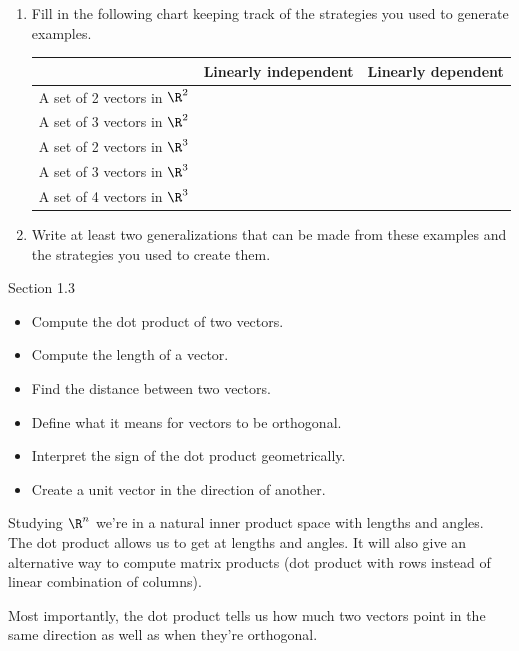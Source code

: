 \documentclass{problemset}
\begin{document}
\begin{enumerate}
	\item Fill in the following chart keeping track of the strategies you used to generate
examples.

\vspace{2mm}

\begin{center}
\begin{tabular}{|c|c|c|}
	\hline
	&Linearly independent & Linearly dependent \\
	\hline
	A set of 2 vectors in $\R^2$ &&\\
	\hline
	A set of 3 vectors in $\R^2$ &&\\
	\hline
	A set of 2 vectors in $\R^3$ &&\\
	\hline
	A set of 3 vectors in $\R^3$ &&\\
	\hline
	A set of 4 vectors in $\R^3$ &&\\
	\hline
\end{tabular}
\end{center}
	
		\item Write at least two generalizations that can
			be made from these examples and the strategies you
			used to create them.

\end{enumerate}


\newpage
\pagestyle{siefken}


\begin{lesson}
	\newpage

	Section 1.3

	\begin{itemize}
		\item Compute the dot product of two vectors.
		\item Compute the length of a vector.
		\item Find the distance between two vectors.
		\item Define what it means for vectors to be orthogonal.
		\item Interpret the sign of the dot product geometrically.
		\item Create a unit vector in the direction of another.
	\end{itemize}

	Studying $\R^n$ we're in a natural inner product space with lengths and
	angles. The dot product allows us to get at lengths and angles. It will
	also give an alternative way to compute matrix products (dot product with rows
	instead of linear combination of columns). 

	Most importantly, the dot product tells us how much two vectors point in
	the same direction as well as when they're orthogonal. 

	\newpage
\end{lesson}
\end{document}
